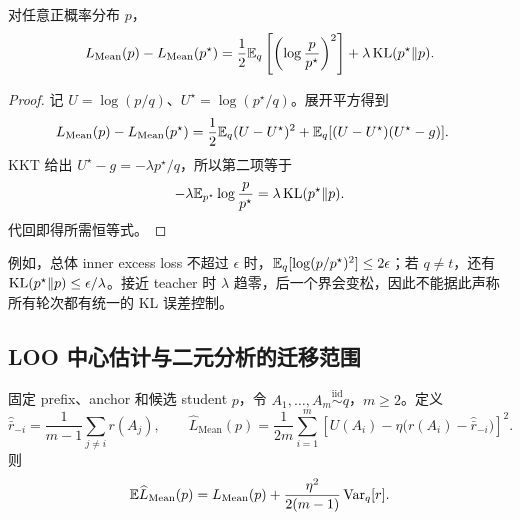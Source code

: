 \begin{proposition}
\label{dyn:prop:mean-opd-excess-identity}
对任意正概率分布 $p$，
\begin{equation}
 L_{\mathrm{Mean}}(p)-L_{\mathrm{Mean}}(p^\star)
 =\frac12\mathbb E_q\left[\left(\log\frac p{p^\star}\right)^2\right]
       +\lambda\operatorname{KL}(p^\star\Vert p).
 \label{dyn:eq:mean-opd-excess-identity}
\end{equation}
\end{proposition}

\begin{proof}
记 $U=\log(p/q)$、$U^\star=\log(p^\star/q)$。展开平方得到
\begin{align*}
 L_{\mathrm{Mean}}(p)-L_{\mathrm{Mean}}(p^\star)
 &=\frac12\mathbb E_q(U-U^\star)^2
   +\mathbb E_q[(U-U^\star)(U^\star-g)].
\end{align*}
KKT 给出 $U^\star-g=-\lambda p^\star/q$，所以第二项等于
\begin{equation*}
 -\lambda\mathbb E_{p^\star}\log\frac p{p^\star}
 =\lambda\operatorname{KL}(p^\star\Vert p).
\end{equation*}
代回即得所需恒等式。
\end{proof}

例如，总体 inner excess loss 不超过 $\epsilon$ 时，$\mathbb E_q[\log(p/p^\star)^2]\le2\epsilon$；若 $q\ne t$，还有 $\operatorname{KL}(p^\star\Vert p)\le\epsilon/\lambda$。接近 teacher 时 $\lambda$ 趋零，后一个界会变松，因此不能据此声称所有轮次都有统一的 KL 误差控制。

\subsection{LOO 中心估计与二元分析的迁移范围}

\begin{proposition}
\label{dyn:prop:mean-opd-loo-expectation}
固定 prefix、anchor 和候选 student $p$，令 $A_1,\ldots,A_m\overset{\mathrm{iid}}\sim q$，$m\ge2$。定义
\begin{equation*}
 \widehat{\bar r}_{-i}=\frac1{m-1}\sum_{j\ne i}r(A_j),
 \qquad
 \widehat L_{\mathrm{Mean}}(p)
 =\frac1{2m}\sum_{i=1}^m
 \left[U(A_i)-\eta\bigl(r(A_i)-\widehat{\bar r}_{-i}\bigr)\right]^2.
\end{equation*}
则
\begin{equation}
 \mathbb E\widehat L_{\mathrm{Mean}}(p)
 =L_{\mathrm{Mean}}(p)
  +\frac{\eta^2}{2(m-1)}\operatorname{Var}_q[r].
 \label{dyn:eq:mean-opd-loo-expectation}
\end{equation}
\end{proposition}

